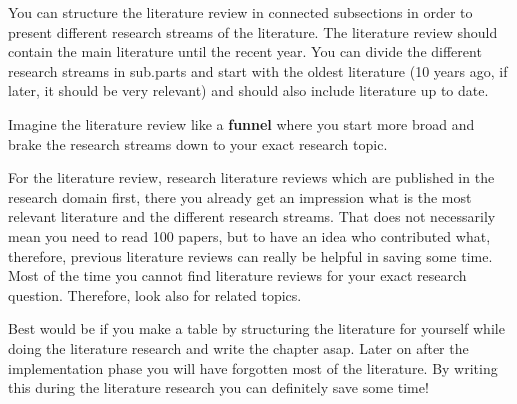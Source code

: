 You can structure the literature review in connected subsections in order to present different research streams of the literature. The literature review should contain the main literature until the recent year. You can divide the different research streams in sub.parts and start with the oldest literature (10 years ago, if later, it should be very relevant) and should also include literature up to date. 

Imagine the literature review like a \textbf{funnel} where you start more broad and brake the research streams down to your exact research topic. 

For the literature review, research literature reviews which are published in the research domain first, there you already get an impression what is the most relevant literature and the different research streams. That does not necessarily mean you need to read 100 papers, but to have an idea who contributed what, therefore, previous literature reviews can really be helpful in saving some time. Most of the time you cannot find literature reviews for your exact research question. Therefore, look also for related topics. 

Best would be if you make a table by structuring the literature for yourself while doing the literature research and write the chapter asap. Later on after the implementation phase you will have forgotten most of the literature. By writing this during the literature research you can definitely save some time! 
